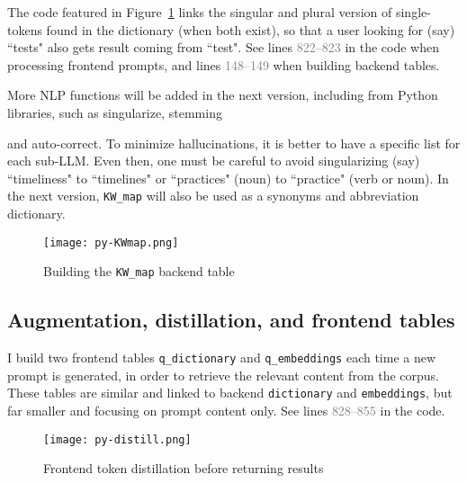 \documentclass[10pt]{article}
\begin{document}
The code featured in Figure~\ref{fd3mkkdi90} links the singular and plural version of single-tokens found in the dictionary (when both exist), so that a user looking for (say) ``tests" also gets result coming from ``test".  See lines \textcolor{gray}{822--823} in the code when processing 
frontend prompts, and lines \textcolor{gray}{148--149} when building backend tables.

More NLP functions will be added in the next version, including from Python libraries,
 such as \textcolor{index}{singularize}, \textcolor{index}{stemming}{ and 
\textcolor{index}{auto-correct}. To minimize hallucinations, it is better to have a specific list for 
 each sub-LLM. Even then, one must be careful to avoid 
singularizing (say) ``timeliness" to ``timelines" or ``practices" (noun) to  ``practice" (verb or noun). In the next
 version, \texttt{KW\_map} will also be used as a \textcolor{index}{synonyms} and 
\textcolor{index}{abbreviation} dictionary. 

\begin{figure}[H]
\centering
\texttt{[image: py-KWmap.png]}
\caption{Building the \texttt{KW\_map} backend table}
\label{fd3mkkdi90}
\end{figure}


\subsection{Augmentation, distillation, and frontend tables}

I build two frontend tables \texttt{q\_dictionary} and \texttt{q\_embeddings} each time a new prompt is generated, in order to retrieve the relevant content from the corpus.
These tables are similar and linked to
 backend \texttt{dictionary} and \texttt{embeddings}, but far smaller and focusing on prompt content only. See
 lines \textcolor{gray}{828--855} in the code.




\begin{figure}[H]
\centering
\texttt{[image: py-distill.png]}
\caption{Frontend token distillation before returning results}
\label{ffgh4nz0}
\end{figure}

}
\end{document}
